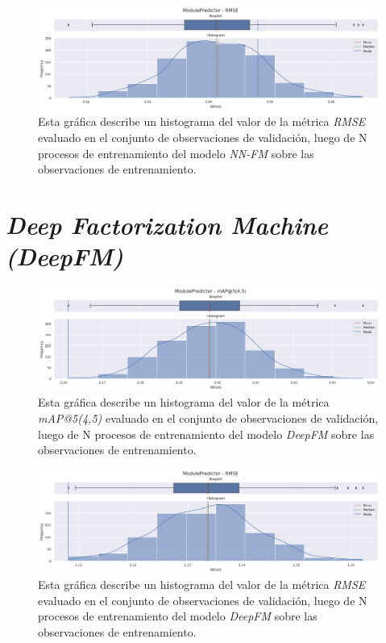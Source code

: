\documentclass[11pt,a4paper,twoside]{thesis}
\begin{document}
\begin{figure}[h!]
	\centering
	\includegraphics[width=15cm]{./images/metrics-NN-FM-RMSE.png}
	\caption{Esta gráfica describe un histograma del valor de la
		métrica \textit{RMSE} evaluado en el conjunto de observaciones
		de validación, luego de N procesos de entrenamiento del
		modelo \textit{NN-FM} sobre las observaciones de entrenamiento.}
\end{figure}

\clearpage

\section{\textit{Deep Factorization Machine (DeepFM)}}

\begin{figure}[h!]
	\centering
	\includegraphics[width=15cm]{./images/metrics-DeepFM-mapk.png}
	\caption{Esta gráfica describe un histograma del valor de la
		métrica \textit{mAP@5(4,5)} evaluado en el conjunto de
		observaciones de validación, luego de N procesos de
		entrenamiento del modelo \textit{DeepFM} sobre las observaciones
		de entrenamiento.}
\end{figure}

\begin{figure}[h!]
	\centering
	\includegraphics[width=15cm]{./images/metrics-DeepFM-RMSE.png}
	\caption{Esta gráfica describe un histograma del valor de la
		métrica \textit{RMSE} evaluado en el conjunto de observaciones
		de validación, luego de N procesos de entrenamiento del modelo
		\textit{DeepFM} sobre las observaciones de entrenamiento.}
\end{figure}
\end{document}

